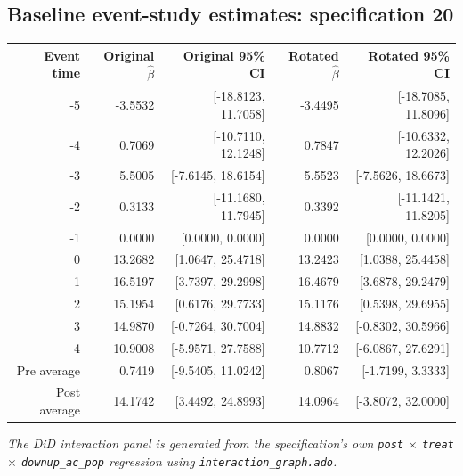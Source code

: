 \documentclass[10pt]{article}
\begin{document}
\subsection*{Baseline event-study estimates: specification 20}
\begin{center}
\scriptsize
\begin{tabular}{r rr rr}
\toprule
Event time & Original $\hat\beta$ & Original 95\% CI & Rotated $\hat\beta$ & Rotated 95\% CI \\
\midrule
-5 & -3.5532 & [-18.8123, 11.7058] & -3.4495 & [-18.7085, 11.8096] \\
-4 & 0.7069 & [-10.7110, 12.1248] & 0.7847 & [-10.6332, 12.2026] \\
-3 & 5.5005 & [-7.6145, 18.6154] & 5.5523 & [-7.5626, 18.6673] \\
-2 & 0.3133 & [-11.1680, 11.7945] & 0.3392 & [-11.1421, 11.8205] \\
-1 & 0.0000 & [0.0000, 0.0000] & 0.0000 & [0.0000, 0.0000] \\
0 & 13.2682 & [1.0647, 25.4718] & 13.2423 & [1.0388, 25.4458] \\
1 & 16.5197 & [3.7397, 29.2998] & 16.4679 & [3.6878, 29.2479] \\
2 & 15.1954 & [0.6176, 29.7733] & 15.1176 & [0.5398, 29.6955] \\
3 & 14.9870 & [-0.7264, 30.7004] & 14.8832 & [-0.8302, 30.5966] \\
4 & 10.9008 & [-5.9571, 27.7588] & 10.7712 & [-6.0867, 27.6291] \\
\midrule
Pre average & 0.7419 & [-9.5405, 11.0242] & 0.8067 & [-1.7199, 3.3333] \\
Post average & 14.1742 & [3.4492, 24.8993] & 14.0964 & [-3.8072, 32.0000] \\
\bottomrule
\end{tabular}
\end{center}
\medskip
\textit{The DiD interaction panel is generated from the specification's own \texttt{post} $\times$ \texttt{treat} $\times$ \texttt{downup\_ac\_pop} regression using \texttt{interaction\_graph.ado}.}
\clearpage
\end{document}
